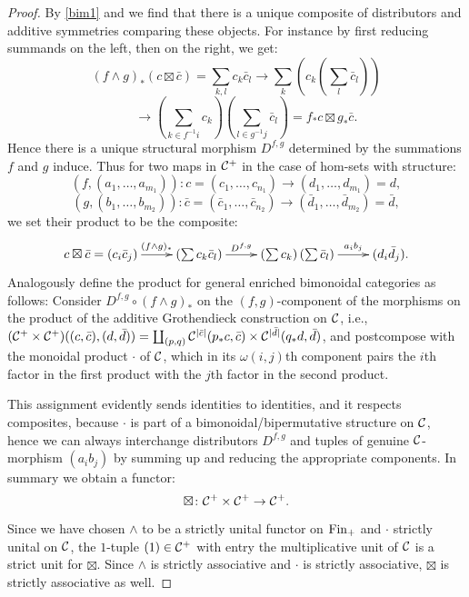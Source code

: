 {{\begin{proof}
	By \ref{bim1} and \cite{Lap} we find that there is a unique composite
	of distributors and additive symmetries comparing these objects. For
	instance by first reducing summands on the left, then on the right,
	we get: \[(f\wedge g)_*(c\boxtimes \bar c) = \sum_{k,l}c_k\bar c_l
	\rightarrow \sum_k\left(c_k\left(\sum_l\bar c_l\right)\right)\]
	\[~~~~~~~
	\rightarrow \left(\sum_{k\in f^{-1}i}c_k\right)
	\left(\sum_{l\in g^{-1}j}\bar c_l\right) = f_*c\boxtimes g_*\bar c.\]
	Hence there is a unique structural morphism $D^{f,g}$ determined by
	the summations $f$ and $g$ induce. Thus for two
	maps in $\mathcal{C}^+$ in the case of hom-sets with structure:
	\[(f,(a_1,\ldots,a_{m_1}))\colon c=(c_1,\ldots,c_{n_1})
	\rightarrow (d_1,\ldots,d_{m_1})=d,\]\[(g,(b_1,\ldots,b_{m_2}))\colon 
	\bar c=(\bar c_1,\ldots,\bar c_{n_2})\rightarrow 
	(\bar d_1,\ldots,\bar d_{m_2})=\bar d,\]
	we set their product to be the composite:
	\[\xymatrix{c\boxtimes \bar c = (c_i\bar c_j) \ar[r]^-{(f\wedge g)_*}&
	\left(\sum c_k\bar c_l\right)\ar[r]^-{D^{f,g}}&	\left(\sum c_k
	\right)\left(\sum\bar c_l\right) \ar[r]^-{a_ib_j}&(d_i\bar d_j).}\]
	Analogously define the product for general enriched bimonoidal categories as
    follows: Consider $D^{f,g}\circ (f\wedge g)_*$ on the $(f,g)$-component
	of the morphisms on the product of the additive Grothendieck construction
	on $\mathcal{C}$, i.e., $(\mathcal{C}^+\times\mathcal{C}^+)((c,\bar c),(d,\bar d))=
	\coprod_{(p,q)}\mathcal{C}^{|\bar c|}(p_*c,\bar c)\times \mathcal{C}^{|\bar d|}(q_*d,\bar d)$,
	and postcompose with the monoidal product $\cdot$ of $\mathcal{C}$, which in its
	$\omega(i,j)$th component pairs the $i$th factor in the first product 
	with the $j$th factor in the second product.

	This assignment evidently sends identities to identities, and it
	respects composites, because $\cdot$ is part of a bimonoidal/bipermutative
	structure on $\mathcal{C}$, hence we can always interchange distributors $D^{f,g}$
	and tuples of genuine $\mathcal{C}$-morphism $(a_ib_j)$ by summing up and reducing
	the appropriate components.
	In summary we obtain a functor:
	\[\boxtimes\colon \mathcal{C}^+\times\mathcal{C}^+\rightarrow \mathcal{C}^+.\]

	Since we have chosen $\wedge$ to be a strictly unital functor 
	on $\mathrm{Fin}_+$ and $\cdot$ strictly unital on $\mathcal{C}$, the $1$-tuple 
	$(1)\in\mathcal{C}^+$ with entry the multiplicative unit of $\mathcal{C}$ is a 
	strict unit for $\boxtimes$. Since $\wedge$ is strictly associative
	and $\cdot$ is strictly associative, $\boxtimes$ is strictly associative
	as well.


\end{proof}}}
